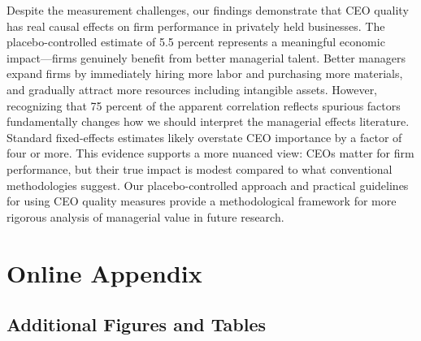 \documentclass[11pt,a4paper]{article}
\begin{document}
Despite the measurement challenges, our findings demonstrate that CEO quality has real causal effects on firm performance in privately held businesses. The placebo-controlled estimate of 5.5 percent represents a meaningful economic impact—firms genuinely benefit from better managerial talent. Better managers expand firms by immediately hiring more labor and purchasing more materials, and gradually attract more resources including intangible assets. However, recognizing that 75 percent of the apparent correlation reflects spurious factors fundamentally changes how we should interpret the managerial effects literature. Standard fixed-effects estimates likely overstate CEO importance by a factor of four or more. This evidence supports a more nuanced view: CEOs matter for firm performance, but their true impact is modest compared to what conventional methodologies suggest. Our placebo-controlled approach and practical guidelines for using CEO quality measures provide a methodological framework for more rigorous analysis of managerial value in future research.





\appendix
\section{Online Appendix}
\subsection{Additional Figures and Tables}
\renewcommand{\thefigure}{A\arabic{figure}}
\renewcommand{\thetable}{A\arabic{table}}




\end{document}

